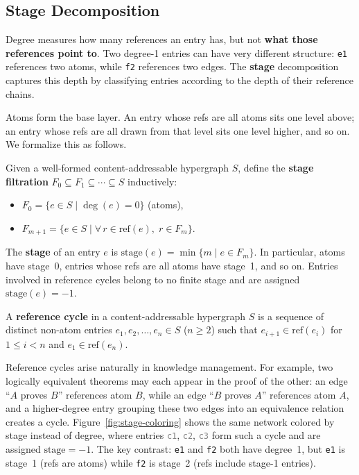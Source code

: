 \subsection{Stage Decomposition}

Degree measures how many references an entry has, but not \textbf{what those references point to}. Two degree-1 entries can have very different structure: \texttt{e1} references two atoms, while \texttt{f2} references two edges. The \textbf{stage} decomposition captures this depth by classifying entries according to the depth of their reference chains.

Atoms form the base layer. An entry whose refs are all atoms sits one level above; an entry whose refs are all drawn from that level sits one level higher, and so on. We formalize this as follows.

\begin{definition}
Given a well-formed content-addressable hypergraph $S$, define the \textbf{stage filtration} $F_0 \subseteq F_1 \subseteq \cdots \subseteq S$ inductively:
\begin{itemize}
  \item $F_0 = \{ e \in S \mid \deg(e) = 0 \}$ \quad (atoms),
  \item $F_{m+1} = \{ e \in S \mid \forall\, r \in \mathrm{ref}(e),\; r \in F_m \}$.
\end{itemize}
The \textbf{stage} of an entry $e$ is $\mathrm{stage}(e) = \min\{m \mid e \in F_m\}$. In particular, atoms have stage~0, entries whose refs are all atoms have stage~1, and so on. Entries involved in reference cycles belong to no finite stage and are assigned $\mathrm{stage}(e) = -1$.
\end{definition}

\begin{definition}
A \textbf{reference cycle} in a content-addressable hypergraph $S$ is a sequence of distinct non-atom entries $e_1, e_2, \ldots, e_n \in S$ ($n \geq 2$) such that $e_{i+1} \in \mathrm{ref}(e_i)$ for $1 \leq i < n$ and $e_1 \in \mathrm{ref}(e_n)$.
\end{definition}

\noindent Reference cycles arise naturally in knowledge management. For example, two logically equivalent theorems may each appear in the proof of the other: an edge ``$A$ proves $B$'' references atom $B$, while an edge ``$B$ proves $A$'' references atom $A$, and a higher-degree entry grouping these two edges into an equivalence relation creates a cycle. Figure~\ref{fig:stage-coloring} shows the same network colored by stage instead of degree, where entries \textcolor{gray}{\texttt{c1}}, \textcolor{gray}{\texttt{c2}}, \textcolor{gray}{\texttt{c3}} form such a cycle and are assigned $\mathrm{stage} = -1$. The key contrast: \textcolor{blue!70!black}{\texttt{e1}} and \textcolor{red!70!black}{\texttt{f2}} both have degree~1, but \textcolor{blue!70!black}{\texttt{e1}} is stage~1 (refs are atoms) while \textcolor{red!70!black}{\texttt{f2}} is stage~2 (refs include stage-1 entries).


